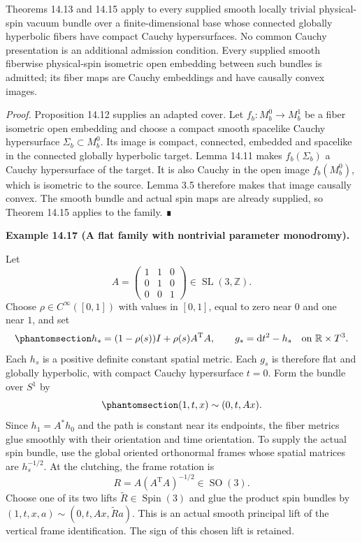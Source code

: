 \documentclass[
  english,
  11pt,
  reqno]{amsart}
\makeatletter
\newcommand{\pandocstatementheading}[1]{%
  \par\if@nobreak\else
    \addpenalty{\@beginparpenalty}%
    \addvspace{.5\baselineskip plus .2\baselineskip minus .2\baselineskip}%
  \fi
  {\normalfont\bfseries #1\par}%
  \nobreak\@afterindenttrue\@afterheading
}
\makeatother
\begin{document}
Theorems 14.13 and 14.15 apply to every supplied smooth locally trivial
physical-spin vacuum bundle over a finite-dimensional base whose
connected globally hyperbolic fibers have compact Cauchy hypersurfaces.
No common Cauchy presentation is an additional admission condition.
Every supplied smooth fiberwise physical-spin isometric open embedding
between such bundles is admitted; its fiber maps are Cauchy embeddings
and have causally convex images.

\emph{Proof.} Proposition 14.12 supplies an adapted cover. Let
\(f_b:M_b^0\to M_b^1\) be a fiber isometric open embedding and choose a
compact smooth spacelike Cauchy hypersurface \(\Sigma_b\subset M_b^0\).
Its image is compact, connected, embedded and spacelike in the connected
globally hyperbolic target. Lemma 14.11 makes \(f_b(\Sigma_b)\) a Cauchy
hypersurface of the target. It is also Cauchy in the open image
\(f_b(M_b^0)\), which is isometric to the source. Lemma 3.5 therefore
makes that image causally convex. The smooth bundle and actual spin maps
are already supplied, so Theorem 14.15 applies to the family. ∎

\pandocstatementheading{\protect{}\label{ex:torus-monodromy-family}Example 14.17 (A flat family with nontrivial parameter monodromy).}

Let \[
A=\begin{pmatrix}1&1&0\\0&1&0\\0&0&1\end{pmatrix}
\in\operatorname{SL}(3,\mathbb Z).
\] Choose \(\rho\in C^\infty([0,1])\) with values in \([0,1]\), equal to
zero near \(0\) and one near \(1\), and set
\begin{equation}\protect\phantomsection\label{eq:torus-monodromy-metric}{
h_s=(1-\rho(s))I+\rho(s)A^{\mathrm T}A,
\qquad
g_s=\mathrm dt^2-h_s
\quad\text{on }\mathbb R\times T^3.
}\end{equation} Each \(h_s\) is a positive definite constant spatial
metric. Each \(g_s\) is therefore flat and globally hyperbolic, with
compact Cauchy hypersurface \(t=0\). Form the bundle over \(S^1\) by
\begin{equation}\protect\phantomsection\label{eq:torus-monodromy-clutching}{
(1,t,x)\sim(0,t,Ax).
}\end{equation} Since \(h_1=A^*h_0\) and the path is constant near its
endpoints, the fiber metrics glue smoothly with their orientation and
time orientation. To supply the actual spin bundle, use the global
oriented orthonormal frames whose spatial matrices are \(h_s^{-1/2}\).
At the clutching, the frame rotation is \[
R=A(A^{\mathrm T}A)^{-1/2}\in\operatorname{SO}(3).
\] Choose one of its two lifts \(\widetilde R\in\operatorname{Spin}(3)\)
and glue the product spin bundles by
\((1,t,x,a)\sim(0,t,Ax,\widetilde R a)\). This is an actual smooth
principal lift of the vertical frame identification. The sign of this
chosen lift is retained.
\end{document}
